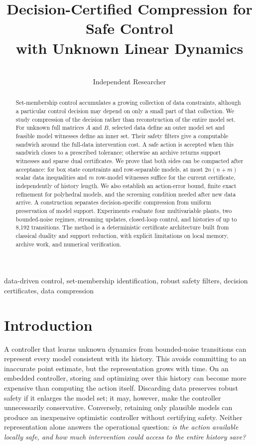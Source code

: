 \documentclass{l4dc2026}
\title[Decision-Certified Compression]{Decision-Certified Compression for Safe Control\\with Unknown Linear Dynamics}
\author{\Name{Shivam Gupta} \Email{shivam1720406@gmail.com}\\\addr Independent Researcher}
\begin{document}
\maketitle
\begin{abstract}
Set-membership control accumulates a growing collection of data constraints, although a particular control decision may depend on only a small part of that collection. We study compression of the decision rather than reconstruction of the entire model set. For unknown full matrices $A$ and $B$, selected data define an outer model set and feasible model witnesses define an inner set. Their safety filters give a computable sandwich around the full-data intervention cost. A safe action is accepted when this sandwich closes to a prescribed tolerance; otherwise an archive returns support witnesses and sparse dual certificates. We prove that both sides can be compacted after acceptance: for box state constraints and row-separable models, at most $2n(n+m)$ scalar data inequalities and $m$ row-model witnesses suffice for the current certificate, independently of history length. We also establish an action-error bound, finite exact refinement for polyhedral models, and the screening condition needed after new data arrive. A construction separates decision-specific compression from uniform preservation of model support. Experiments evaluate four multivariable plants, two bounded-noise regimes, streaming updates, closed-loop control, and histories of up to 8,192 transitions. The method is a deterministic certificate architecture built from classical duality and support reduction, with explicit limitations on local memory, archive work, and numerical verification.
\end{abstract}
\begin{keywords}data-driven control, set-membership identification, robust safety filters, decision certificates, data compression\end{keywords}

\section{Introduction}
A controller that learns unknown dynamics from bounded-noise transitions can represent every model consistent with its history. This avoids committing to an inaccurate point estimate, but the representation grows with time. On an embedded controller, storing and optimizing over this history can become more expensive than computing the action itself. Discarding data preserves robust safety if it enlarges the model set; it may, however, make the controller unnecessarily conservative. Conversely, retaining only plausible models can produce an inexpensive optimistic controller without certifying safety. Neither representation alone answers the operational question: \emph{is the action available locally safe, and how much intervention could access to the entire history save?}
\end{document}

